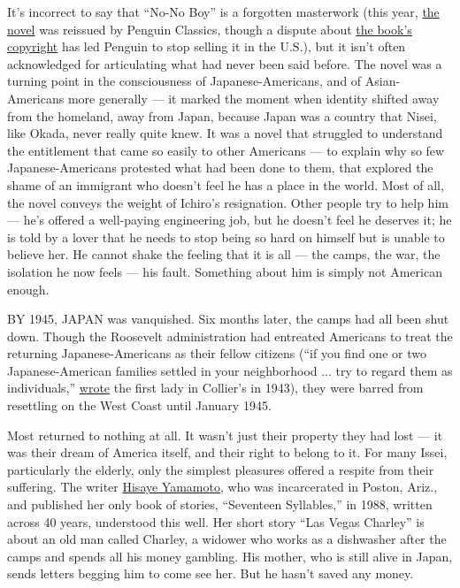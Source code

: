 It's incorrect to say that ``No-No Boy'' is a forgotten masterwork (this
year, \href{https://uwapress.uw.edu/book/9780295994048/no-no-boy/}{the
novel} was reissued by Penguin Classics, though a dispute about
\href{https://www.nytimes3xbfgragh.onion/2019/06/06/books/no-no-boy-penguin.html}{the
book's copyright} has led Penguin to stop selling it in the U.S.), but
it isn't often acknowledged for articulating what had never been said
before. The novel was a turning point in the consciousness of
Japanese-Americans, and of Asian-Americans more generally --- it marked
the moment when identity shifted away from the homeland, away from
Japan, because Japan was a country that Nisei, like Okada, never really
quite knew. It was a novel that struggled to understand the entitlement
that came so easily to other Americans --- to explain why so few
Japanese-Americans protested what had been done to them, that explored
the shame of an immigrant who doesn't feel he has a place in the world.
Most of all, the novel conveys the weight of Ichiro's resignation. Other
people try to help him --- he's offered a well-paying engineering job,
but he doesn't feel he deserves it; he is told by a lover that he needs
to stop being so hard on himself but is unable to believe her. He cannot
shake the feeling that it is all --- the camps, the war, the isolation
he now feels --- his fault. Something about him is simply not American
enough.

BY 1945, JAPAN was vanquished. Six months later, the camps had all been
shut down. Though the Roosevelt administration had entreated Americans
to treat the returning Japanese-Americans as their fellow citizens (``if
you find one or two Japanese-American families settled in your
neighborhood ... try to regard them as individuals,''
\href{https://www2.gwu.edu/~erpapers/documents/articles/challengetoamerican.cfm}{wrote}
the first lady in Collier's in 1943), they were barred from resettling
on the West Coast until January 1945.

Most returned to nothing at all. It wasn't just their property they had
lost --- it was their dream of America itself, and their right to belong
to it. For many Issei, particularly the elderly, only the simplest
pleasures offered a respite from their suffering. The writer
\href{https://www.latimes.com/local/obituaries/la-xpm-2011-feb-13-la-me-hisaye-yamamoto-20110213-story.html}{Hisaye
Yamamoto}, who was incarcerated in Poston, Ariz., and published her only
book of stories, ``Seventeen Syllables,'' in 1988, written across 40
years, understood this well. Her short story ``Las Vegas Charley'' is
about an old man called Charley, a widower who works as a dishwasher
after the camps and spends all his money gambling. His mother, who is
still alive in Japan, sends letters begging him to come see her. But he
hasn't saved any money.

